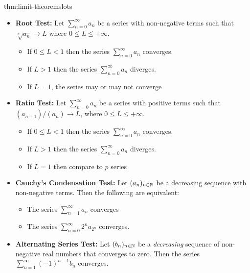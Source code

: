 \documentclass[landscape, 8pt]{extarticle}
\begin{document}
\begin{multicols}{3}
\begin{thm}{thm:limit-theorems}{lots}
\begin{itemize}
    \item \textbf{Root Test:} Let $\sum_{n=0}^{\infty} a_n$ be a series with non-negative terms such that $\sqrt[n]{a_n} \to L$ where $0 \le L \le +\infty$.
    \renewcommand\labelitemi{\tiny$\bullet$}
    \vspace{-5pt}
    \begin{itemize}
        \setlength\itemsep{0em}
        \item If $0\le L < 1$ then the series $\sum_{n=0}^{\infty}  a_n$ converges.
        \item If $L > 1$ then the series $\sum_{n=0}^{\infty}  a_n$ diverges.
        \item If $L = 1$, the series may or may not converge
    \end{itemize}
    \vspace{-5pt}

    \item \textbf{Ratio Test:} Let $\sum_{n=0}^{\infty}  a_n$ be a series with positive terms such that $(a_{n+1}) / (a_n) \to L$, where $0\le L \le +\infty$.
    \renewcommand\labelitemi{\tiny$\bullet$}
    \vspace{-5pt}
    \begin{itemize}
        \setlength\itemsep{0em}
        \item If $0\le L < 1$ then the series $\sum_{n=0}^{\infty}  a_n$ converges.
        \item If $L > 1$ then the series $\sum_{n=0}^{\infty}  a_n$ diverges.
        \item If $L = 1$ then compare to $p$ series
    \end{itemize}
    \vspace{-5pt}

    \item \textbf{Cauchy's Condensation Test:} Let $(a_n)_{n\in\mathbb{N}}$ be a decreasing sequence with non-negative terms. Then the following are equivalent:
    \vspace{-5pt}
    \renewcommand\labelitemi{\tiny$\bullet$}
    \begin{itemize}
        \setlength\itemsep{0em}
        \item The series $\sum_{n=1}^{\infty}  a_n$ converges
        \item The series $\sum_{n=0}^{\infty}  2^na_{2^n}$ converges.
    \end{itemize}
    \vspace{-5pt}

    \item \textbf{Alternating Series Test:} Let $(b_n)_{n\in\mathbb{N}}$ be a \textit{decreasing} sequence of non-negative real numbers that converges to zero. Then the series $\sum_{n=1}^{\infty} (-1)^{n-1}b_n$ converges.
    

\end{itemize}
\end{thm}
\end{multicols}
\end{document}
